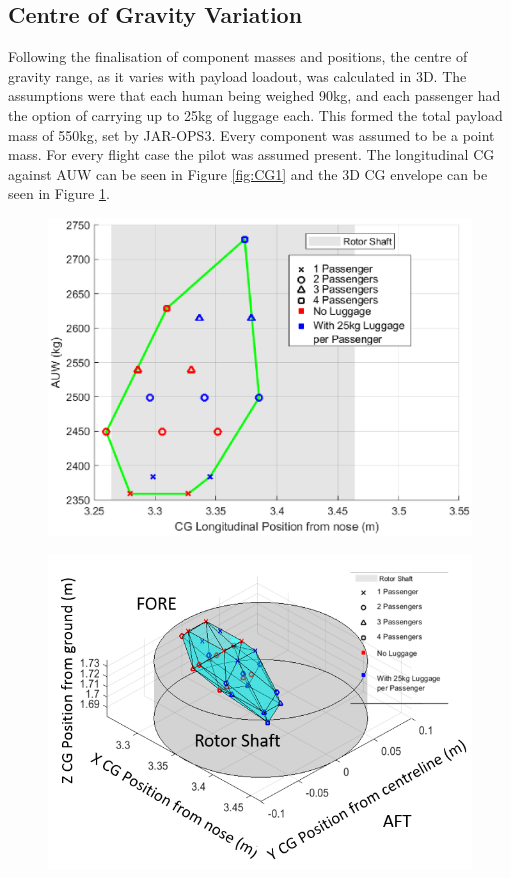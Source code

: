 \documentclass[11pt,a4paper]{article}
\begin{document}
\subsection{Centre of Gravity Variation}
Following the finalisation of component masses and positions, the centre of gravity range, as it varies with payload loadout, was calculated in 3D. The assumptions were that each human being weighed 90kg, and each passenger had the option of carrying up to 25kg of luggage each. This formed the total payload mass of 550kg, set by JAR-OPS3. Every component was assumed to be a point mass. For every flight case the pilot was assumed present.
The longitudinal CG against AUW can be seen in Figure \ref{fig:CG1} and the 3D CG envelope can be seen in Figure \ref{fig:CG2}.

\begin{figure}[H]
\centering
\begin{minipage}{.5\textwidth}
  \centering
  \includegraphics[width=\linewidth]{CGVAUW.eps}
  \label{fig:CG1}
\end{minipage}%
\begin{minipage}{.5\textwidth}
  \centering
  \includegraphics[width=\linewidth]{3D.PNG}
  \label{fig:CG2}
\end{minipage}
\end{figure}
\end{document}
